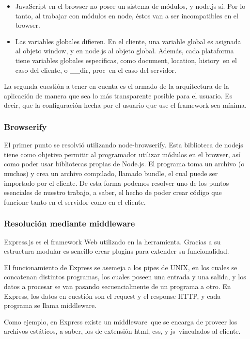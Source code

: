 \documentclass[doc,helv,longtable]{article}
\begin{document}
\begin{itemize}
\item  JavaScript en el browser no posee un sistema de módulos, y node.js sí. Por lo tanto, al trabajar con módulos en node, éstos van a ser incompatibles en el browser.  
\item  Las variables globales difieren. En el cliente, una variable global es asignada al objeto window, y en node.js al objeto global. Además, cada plataforma tiene variables globales específicas, como document, location, history en el caso del cliente, o \_\_dir, proc en el caso del servidor.

\end{itemize}


La segunda cuestión a tener en cuenta es el armado de la arquitectura de la aplicación de manera que sea lo más transparente posible para el usuario. Es decir, que la configuración hecha por el usuario que use el framework sea mínima.\subsubsection{Browserify}


El primer punto se resolvió utilizando node-browserify\cite{browserify}. Esta biblioteca de nodejs tiene como objetivo permitir al programador utilizar módulos en el browser, así como poder usar bibliotecas propias de Node.js. El programa toma un archivo (o muchos) y crea un archivo compilado, llamado bundle, el cual puede ser importado por el cliente. De esta forma podemos resolver uno de los puntos esenciales de nuestro trabajo, a saber, el hecho de poder crear código que funcione tanto en el servidor como en el cliente.\subsubsection{Resolución mediante middleware}


Express.js es el framework Web utilizado en la herramienta. Gracias a su estructura modular es sencillo crear plugins para extender su funcionalidad.

El funcionamiento de Express se asemeja a los pipes de UNIX, en los cuales se concatenan distintos programas, los cuales poseen una entrada y una salida, y los datos a procesar se van pasando secuencialmente de un programa a otro. En Express, los datos en cuestión son el request y el response HTTP, y cada programa se llama middleware.

Como ejemplo, en Express existe un middleware que se encarga de proveer los archivos estáticos, a saber, los de extensión html, css, y js vinculados al cliente.  
\end{document}
